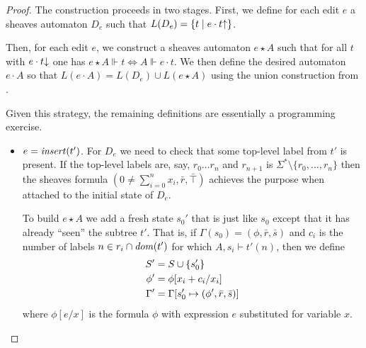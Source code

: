\begin{proof}
The construction proceeds in two stages. First, we define for each edit $e$ a sheaves automaton $D_e$ such that $L(D_e)=\{t\mid e\cdot t{\uparrow}\}$.

Then, for each edit $e$, we construct a sheaves automaton $e\star A$
such that for all $t$ with $e\cdot t{\downarrow}$ one has $e\star A\Vdash
t\iff A\Vdash e\cdot t$. We then define the desired automaton $e\cdot
A$ so that $L(e\cdot A)=L(D_e)\cup L(e\star A)$ using the union
construction from \cite{DalzilioS:POPL04}.

Given this strategy, the remaining definitions are essentially a programming
exercise.
\begin{itemize}
\item $e=\mathit{insert}(t')$. For $D_e$ we need to check that some top-level label
from $t'$ is present. If the top-level labels are, say, $r_0\dots r_n$ and $r_{n+1}$ is
$\Sigma^*\setminus \{r_0,\dots,r_n\}$ then the sheaves formula
$(0\ne\sum_{i=0}^n x_i,\bar r,\bar\top)$
achieves the purpose when attached to the initial state of $D_e$.

To build $e\star A$ we add a fresh state $s_0'$ that is just like $s_0$
except that it has already ``seen'' the subtree $t'$. That is, if
$\Gamma(s_0) = (\phi,\bar r,\bar s)$ and $c_i$ is the number of labels $n
\in r_i \cap \mathit{dom}(t')$ for which $A,s_i \vdash t'(n)$, then we define
\begin{align*}
    S' &= S \cup \{s_0'\} \\
    \phi' &= \phi[x_i + c_i/x_i] \\
    \Gamma' &= \Gamma[s_0' \mapsto (\phi',\bar r,\bar s)]
\end{align*}
where $\phi[e/x]$ is the formula $\phi$ with expression $e$ substituted for
variable $x$.


\end{itemize}
\end{proof}
